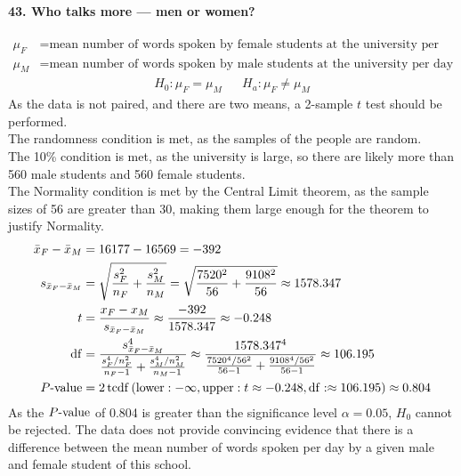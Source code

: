 \documentclass[../Homework]{subfiles}
\begin{document}
		\paragraph{43. Who talks more --- men or women?}
			\begin{align*}
				\mu_F &= \text{mean number of words spoken by female students at the university per day} \\
				\mu_M &= \text{mean number of words spoken by male students at the university per day} 
			\end{align*}
			\begin{align*}
				H_0: \mu_F = \mu_M && H_a: \mu_F \ne \mu_M
			\end{align*}
			As the data is not paired, and there are two means, a 2-sample $t$ test should be performed. \\
			The randomness condition is met, as the samples of the people are random. \\
			The 10\% condition is met, as the university is large, so there are likely more than 560 male students and 560 female students. \\
			The Normality condition is met by the Central Limit theorem, as the sample sizes of 56 are greater than 30, making them large enough for the theorem to justify Normality.
			\begin{align*}
				\bar{x}_F - \bar{x}_M &= 16177 - 16569 = -392 \\
				s_{\bar{x}_F - \bar{x}_M} &= \sqrt{\frac{s_F^2}{n_F} + \frac{s_M^2}{n_M}} = \sqrt{\frac{7520^2}{56} + \frac{9108^2}{56}} \approx 1578.347 \\
				t &= \frac{x_F - x_M}{s_{\bar{x}_F - \bar{x}_M}} \approx \frac{-392}{1578.347} \approx -0.248 \\
				\operatorname{df} &= \frac{s_{\bar{x}_F - \bar{x}_M}^4}{\frac{s_F^4/n_F^2}{n_F - 1} + \frac{s_M^4/n_M^2}{n_M - 1}} \approx \frac{1578.347^4}{\frac{7520^4/56^2}{56 - 1} + \frac{9108^4/56^2}{56 - 1}} \approx 106.195 \\
				P\text{-value} &= 2\operatorname{tcdf}\left(\operatorname{lower}: -\infty, \operatorname{upper}: t \approx -0.248, \operatorname{df}: \approx 106.195\right) \approx 0.804
			\end{align*}
			As the $P\text{-value}$ of 0.804 is greater than the significance level $\alpha = 0.05$, $H_0$ cannot be rejected. The data does not provide convincing evidence that there is a difference between the mean number of words spoken per day by a given male and female student of this school.
\end{document}

